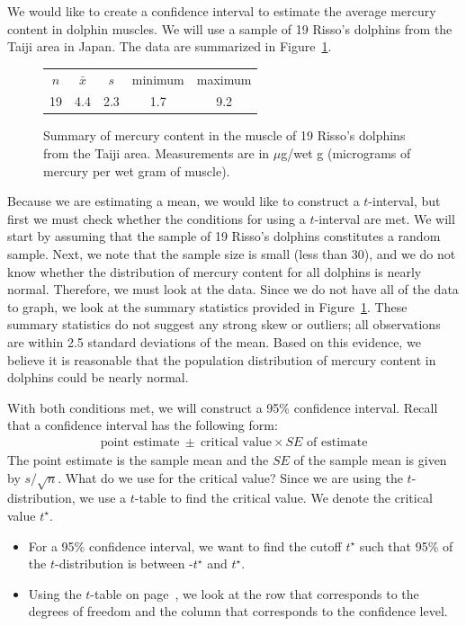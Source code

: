 We would like to create a confidence interval to estimate the average mercury content in dolphin muscles.  We will use a sample of 19 Risso's dolphins from the Taiji area in Japan.  The data are summarized in Figure~\ref{summaryStatsOfHgInMuscleOfRissosDolphins}. 

\begin{figure}[h]
\centering
\begin{tabular}{ccc cc}
\hline
$n$ & $\bar{x}$ & $s$ & minimum & maximum \\
19   & 4.4	  & 2.3  & 1.7	       & 9.2 \\
\hline
\end{tabular}
\caption{Summary of mercury content in the muscle of 19 Risso's dolphins from the Taiji area. Measurements are in $\mu$g/wet g (micrograms of mercury per wet gram of muscle).}
\label{summaryStatsOfHgInMuscleOfRissosDolphins}
\end{figure}

Because we are estimating a mean, we would like to construct a $t$-interval, but first we must check whether the conditions for using a $t$-interval are met.  We will start by assuming that the sample of 19 Risso's dolphins constitutes a random sample.  Next, we note that the sample size is small (less than 30), and we do not know whether the distribution of mercury content for all dolphins is nearly normal.  Therefore, we must look at the data.  Since we do not have all of the data to graph, we look at the summary statistics provided in Figure~\ref{summaryStatsOfHgInMuscleOfRissosDolphins}. These summary statistics do not suggest any strong skew or outliers; all observations are within 2.5 standard deviations of the mean. Based on this evidence, we believe it is reasonable that the population distribution of mercury content in dolphins could be nearly normal.  

With both conditions met, we will construct a 95\% confidence interval.  Recall that a confidence interval has the following form:
\begin{eqnarray*}
\text{point estimate} \ \pm\  \text{critical value}\times SE\text{ of estimate}
\end{eqnarray*}
The point estimate is the sample mean and the $SE$ of the sample mean is given by $s/\sqrt{n}$.  What do we use for the critical value?  Since we are using the $t$-distribution, we use a $t$-table to find the critical value.  We denote the critical value $t^{\star}$.
\begin{itemize}
\setlength{\itemsep}{0mm}
\item For a 95\% confidence interval, we want to find the cutoff $t^{\star}$ such that 95\% of the $t$-distribution is between -$t^{\star}$ and $t^{\star}$.
\item Using the $t$-table on page~\pageref{tTableSample_ch_inf_means}, we look at the row that corresponds to the degrees of freedom and the column that corresponds to the confidence level.
\end{itemize}

